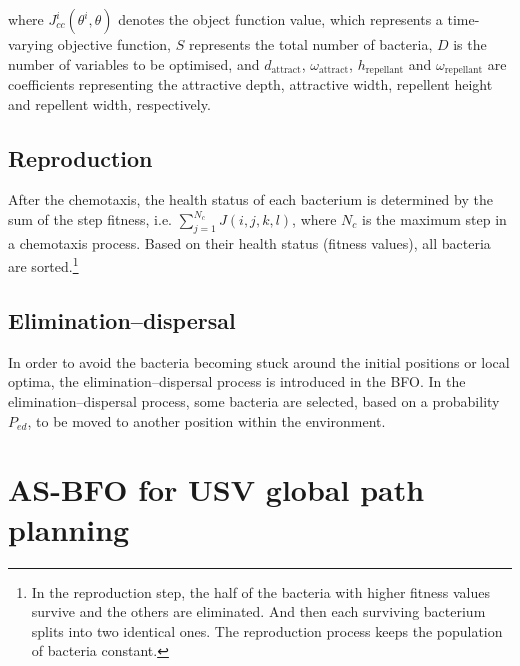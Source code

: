 \documentclass{PDS}%
\theoremstyle{definition}
\begin{document}
where $J_{cc}^i (\theta^i ,\theta)$ denotes the object function value, which represents a
time-varying objective function, $S$ represents the total number of bacteria, $D$ is the
number of variables to be optimised, and $d_{\text{attract}}$, $\omega_{\text{attract}}$,
$h_{\text{repellant}}$ and $\omega_{\text{repellant}}$ are coefficients representing the
attractive depth, attractive width, repellent height and repellent width, respectively.

\subsection{Reproduction}

After the chemotaxis, the health status of each bacterium is determined by the sum of the
step fitness, i.e. $\sum_{j=1}^{N_c}J(i,j,k,l)$, where $N_c$ is the maximum step in a
chemotaxis process. Based on their health status (fitness values), all bacteria are
sorted.\footnote{In the reproduction step, the half of the bacteria with higher fitness values survive
and the others are eliminated. And then each surviving bacterium splits into two
identical ones. The reproduction process keeps the population of
bacteria constant.}

\subsection{Elimination--dispersal}

In order to avoid the bacteria becoming stuck around the initial positions or local
optima, the elimination--dispersal process is introduced in the BFO. In the
elimination--dispersal process, some bacteria are selected, based on a probability
$P_{ed}$, to be moved to another position within the environment.

\section{AS-BFO for USV global path planning}\label{sec3}
\end{document}
